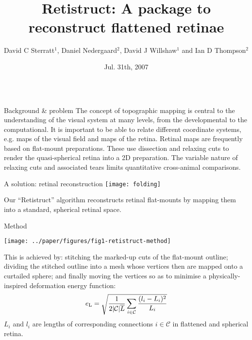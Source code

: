 \documentclass[final]{beamer}
\title{Retistruct: A package to reconstruct flattened retinae}
\author{David C Sterratt$^1$, Daniel Nedergaard$^2$, David J Willshaw$^1$ and Ian D Thompson$^2$}
\institute{$^1$Institute for Adaptive \& Neural Computation, School of
  Informatics, University of Edinburgh\\ $^2$MRC Centre for Developmental
  Neurobiology, King's College London} \date{Jul. 31th, 2007}
\begin{document}
\begin{frame}{} 
  \begin{columns}[T]

    \begin{column}{.37\linewidth}

      \begin{block}{Background \& problem}
        The concept of topographic mapping is central to the
        understanding of the visual system at many levels, from the
        developmental to the computational. It is important to be able
        to relate different coordinate systems, e.g. maps of the
        visual field and maps of the retina. Retinal maps are
        frequently based on flat-mount preparations.  These use
        dissection and relaxing cuts to render the quasi-spherical
        retina into a 2D preparation. The variable nature of relaxing
        cuts and associated tears limits quantitative cross-animal
        comparisons.

      \end{block}

      \begin{block}{A solution: retinal reconstruction}
           \texttt{[image: folding]}     

           Our ``Retistruct'' algorithm reconstructs retinal
           flat-mounts by mapping them into a standard, spherical
           retinal space.

      \end{block}

      \begin{block}{Method}

        \texttt{[image: ../paper/figures/fig1-retistruct-method]}

        This is achieved by: stitching the marked-up cuts of the
        flat-mount outline; dividing the stitched outline into a mesh
        whose vertices then are mapped onto a curtailed sphere; and
        finally moving the vertices so as to minimise a
        physically-inspired deformation energy function: 
        \begin{displaymath}
          e_{\text L}=\sqrt{\frac 1{2|\mathcal{C}|\overline L}\sum _{i\in\mathcal{C}}\frac{(l_i-L_i)^2}{L_i}}
        \end{displaymath}
        $L_i$ and $l_i$ are lengths of corresponding connections
        $i\in\mathcal{C}$ in flattened and spherical retina.
      \end{block}



\end{column}
\end{columns}
\end{frame}
\end{document}
